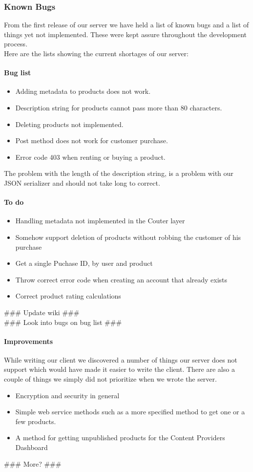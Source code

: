 \subsubsection{Known Bugs}
From the first release of our server we have held a list of known bugs and a list of things yet not implemented. These were kept assure throughout the development process.
\\Here are the lists showing the current shortages of our server:
\paragraph{Bug list}
\begin{itemize}
\item Adding metadata to products does not work.
\item Description string for products cannot pass more than 80 characters.
\item Deleting products not implemented.
\item Post method does not work for customer purchase.
\item Error code 403 when renting or buying a product.
\end{itemize}
The problem with the length of the description string, is a problem with our JSON serializer and should not take long to correct.
\paragraph{To do}
\begin{itemize}
\item Handling metadata not implemented in the C\Sh outer layer
\item Somehow support deletion of products without robbing the customer of his purchase
\item Get a single Puchase ID, by user and product
\item Throw correct error code when creating an account that already exists
\item Correct product rating calculations
\end{itemize}
\#\#\# Update wiki \#\#\#\\
\#\#\# Look into bugs on bug list \#\#\#
\paragraph{Improvements}
While writing our client we discovered a number of things our server does not support which would have made it easier to write the client. There are also a couple of things we simply did not prioritize when we wrote the server.
\begin{itemize}
\item Encryption and security in general
\item Simple web service methods such as a more specified method to get one or a few products.
\item A method for getting unpublished products for the Content Providers Dashboard
\end{itemize}
\#\#\# More? \#\#\#